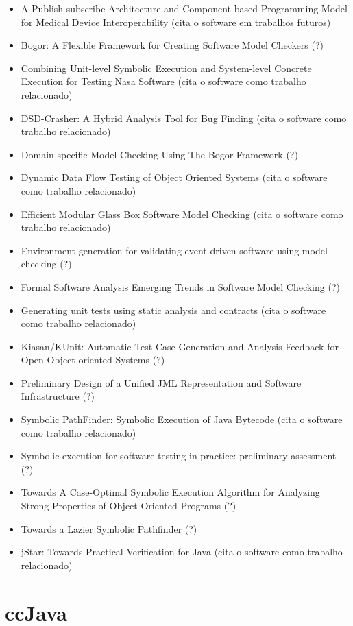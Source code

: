 \begin{itemize}
\item A Publish-subscribe Architecture and Component-based Programming Model for Medical Device Interoperability (cita o software em trabalhos futuros)
\item Bogor: A Flexible Framework for Creating Software Model Checkers (?)
\item Combining Unit-level Symbolic Execution and System-level Concrete Execution for Testing Nasa Software (cita o software como trabalho relacionado)
\item DSD-Crasher: A Hybrid Analysis Tool for Bug Finding (cita o software como trabalho relacionado)
\item Domain-specific Model Checking Using The Bogor Framework (?)
\item Dynamic Data Flow Testing of Object Oriented Systems (cita o software como trabalho relacionado)
\item Efficient Modular Glass Box Software Model Checking (cita o software como trabalho relacionado)
\item Environment generation for validating event-driven software using model checking (?)
\item Formal Software Analysis Emerging Trends in Software Model Checking (?)
\item Generating unit tests using static analysis and contracts (cita o software como trabalho relacionado)
\item Kiasan/KUnit: Automatic Test Case Generation and Analysis Feedback for Open Object-oriented Systems (?)
\item Preliminary Design of a Unified JML Representation and Software Infrastructure (?)
\item Symbolic PathFinder: Symbolic Execution of Java Bytecode (cita o software como trabalho relacionado)
\item Symbolic execution for software testing in practice: preliminary assessment (?)
\item Towards A Case-Optimal Symbolic Execution Algorithm for Analyzing Strong Properties of Object-Oriented Programs (?)
\item Towards a Lazier Symbolic Pathfinder (?)
\item jStar: Towards Practical Verification for Java (cita o software como trabalho relacionado)
\end{itemize}

\section{ccJava}

